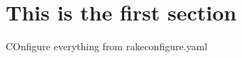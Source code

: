 \documentclass[12,draft,]{article}
\begin{document}
\section{This is the first section}\label{this-is-the-first-section}

COnfigure everything from rakeconfigure.yaml

\printbibliography
\end{document}
